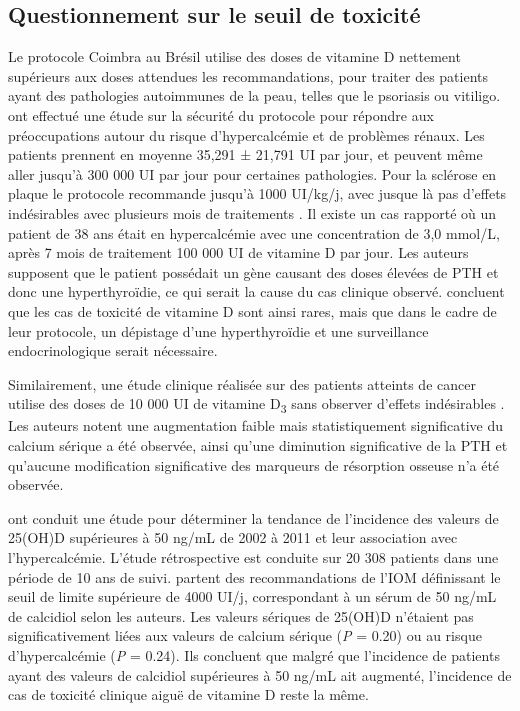 \documentclass[
  a4paper,
  DIV=11,
  numbers=noendperiod,
  listof=totoc]{scrreprt}
\begin{document}
\hypertarget{questionnement-sur-le-seuil-de-toxicituxe9}{%
\subsection{Questionnement sur le seuil de
toxicité}\label{questionnement-sur-le-seuil-de-toxicituxe9}}

Le protocole Coimbra au Brésil utilise des doses de vitamine D nettement
supérieurs aux doses attendues les recommandations, pour traiter des
patients ayant des pathologies autoimmunes de la peau, telles que le
psoriasis ou vitiligo. \textcite{Amon.2022} ont effectué une étude sur
la sécurité du protocole pour répondre aux préoccupations autour du
risque d'hypercalcémie et de problèmes rénaux. Les patients prennent en
moyenne 35,291 ± 21,791 UI par jour, et peuvent même aller jusqu'à 300
000 UI par jour pour certaines pathologies. Pour la sclérose en plaque
le protocole recommande jusqu'à 1000 UI/kg/j, avec jusque là pas
d'effets indésirables avec plusieurs mois de traitements
\autocite{Lemke.2021}. Il existe un cas rapporté où un patient de 38 ans
était en hypercalcémie avec une concentration de 3,0 mmol/L, après 7
mois de traitement 100 000 UI de vitamine D par jour. Les auteurs
supposent que le patient possédait un gène causant des doses élevées de
\ac{PTH} et donc une hyperthyroïdie, ce qui serait la cause du cas
clinique observé. \textcite{Lemke.2021} concluent que les cas de
toxicité de vitamine D sont ainsi rares, mais que dans le cadre de leur
protocole, un dépistage d'une hyperthyroïdie et une surveillance
endocrinologique serait nécessaire.

Similairement, une étude clinique réalisée sur des patients atteints de
cancer utilise des doses de 10 000 UI de vitamine D\textsubscript{3}
sans observer d'effets indésirables \autocite{Amir.2010}. Les auteurs
notent une augmentation faible mais statistiquement significative du
calcium sérique a été observée, ainsi qu'une diminution significative de
la \ac{PTH} et qu'aucune modification significative des marqueurs de
résorption osseuse n'a été observée.

\textcite{Dudenkov.2015} ont conduit une étude pour déterminer la
tendance de l'incidence des valeurs de 25(OH)D supérieures à 50 ng/mL de
2002 à 2011 et leur association avec l'hypercalcémie. L'étude
rétrospective est conduite sur 20 308 patients dans une période de 10
ans de suivi. \textcite{Dudenkov.2015} partent des recommandations de
l'IOM définissant le seuil de limite supérieure de 4000 UI/j,
correspondant à un sérum de 50 ng/mL de calcidiol selon les auteurs. Les
valeurs sériques de 25(OH)D n'étaient pas significativement liées aux
valeurs de calcium sérique (\emph{P} = 0.20) ou au risque
d'hypercalcémie (\emph{P} = 0.24). Ils concluent que malgré que
l'incidence de patients ayant des valeurs de calcidiol supérieures à 50
ng/mL ait augmenté, l'incidence de cas de toxicité clinique aiguë de
vitamine D reste la même.
\end{document}
